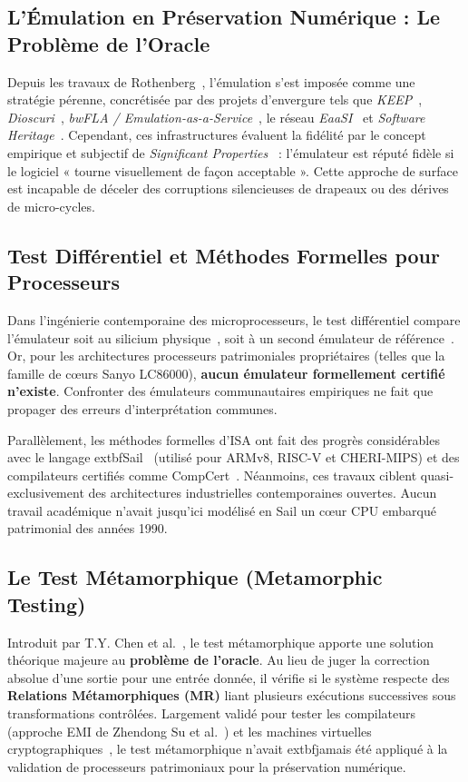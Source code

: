 \documentclass[10pt,journal,compsoc]{IEEEtran}
\begin{document}
\subsection{L'Émulation en Préservation Numérique : Le Problème de l'Oracle}
Depuis les travaux de Rothenberg~\cite{rothenberg1995, rothenberg1999}, l'émulation s'est imposée comme une stratégie pérenne, concrétisée par des projets d'envergure tels que \textit{KEEP}~\cite{vanderhoeven2008}, \textit{Dioscuri}~\cite{vanderhoeven2007dioscuri}, \textit{bwFLA / Emulation-as-a-Service}~\cite{rechert2012}, le réseau \textit{EaaSI}~\cite{cochrane2020eaasi} et \textit{Software Heritage}~\cite{abramatic2018}. Cependant, ces infrastructures évaluent la fidélité par le concept empirique et subjectif de \textit{Significant Properties}~\cite{hedstrom2002, guttenbrunner2010} : l'émulateur est réputé fidèle si le logiciel « tourne visuellement de façon acceptable ». Cette approche de surface est incapable de déceler des corruptions silencieuses de drapeaux ou des dérives de micro-cycles.

\subsection{Test Différentiel et Méthodes Formelles pour Processeurs}
Dans l'ingénierie contemporaine des microprocesseurs, le test différentiel compare l'émulateur soit au silicium physique~\cite{martignoni2009, chen2021emufuzzer}, soit à un second émulateur de référence~\cite{mckeeman1998, paleari2010, herdt2020riscv}. Or, pour les architectures processeurs patrimoniales propriétaires (telles que la famille de cœurs Sanyo LC86000), \textbf{aucun émulateur formellement certifié n'existe}. Confronter des émulateurs communautaires empiriques ne fait que propager des erreurs d'interprétation communes.

Parallèlement, les méthodes formelles d'ISA ont fait des progrès considérables avec le langage 	extbf{Sail}~\cite{armstrong2019} (utilisé pour ARMv8, RISC-V et CHERI-MIPS) et des compilateurs certifiés comme CompCert~\cite{leroy2009}. Néanmoins, ces travaux ciblent quasi-exclusivement des architectures industrielles contemporaines ouvertes. Aucun travail académique n'avait jusqu'ici modélisé en Sail un cœur CPU embarqué patrimonial des années 1990.

\subsection{Le Test Métamorphique (Metamorphic Testing)}
Introduit par T.Y. Chen et al.~\cite{chen1998, chen2018review}, le test métamorphique apporte une solution théorique majeure au \textbf{problème de l'oracle}. Au lieu de juger la correction absolue d'une sortie pour une entrée donnée, il vérifie si le système respecte des \textbf{Relations Métamorphiques (MR)} liant plusieurs exécutions successives sous transformations contrôlées. Largement validé pour tester les compilateurs (approche EMI de Zhendong Su et al.~\cite{le2014}) et les machines virtuelles cryptographiques~\cite{donaldson2023}, le test métamorphique n'avait 	extbf{jamais été appliqué à la validation de processeurs patrimoniaux pour la préservation numérique}.
\end{document}
